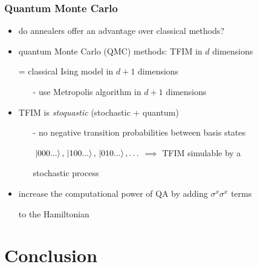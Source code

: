 \documentclass[11pt]{beamer}
\newcommand{\itemb}{\item[$\bullet$]}
\begin{document}
\begin{frame}
    \frametitle{Quantum Monte Carlo}   
    \begin{itemize}
        \setlength{\itemindent}{-1em}
        \itemb do annealers offer an advantage over classical methods?
        \itemb quantum Monte Carlo (QMC) methods: TFIM in $d$ dimensions
        \item [] = classical Ising model in $d+1$ dimensions
        \begin{itemize}
            \setlength{\itemindent}{-1em}
            \item [-] use Metropolis algorithm in $d+1$ dimensions
        \end{itemize}
        \itemb TFIM is \textit{stoquastic} (stochastic + quantum)
        \begin{itemize}
            \setlength{\itemindent}{-1em}
            \item [-] no negative transition probabilities between basis states
            \item [] $\ket*{000...}, \ket*{100...}, \ket*{010...}, \ldots$ $\implies$ TFIM simulable by a
            \item [] stochastic process
        \end{itemize}
        \itemb increase the computational power of QA by adding $\sigma^x \sigma^x$ terms
        \item [] to the Hamiltonian
    \end{itemize}
\end{frame}

\section{Conclusion}
\end{document}
